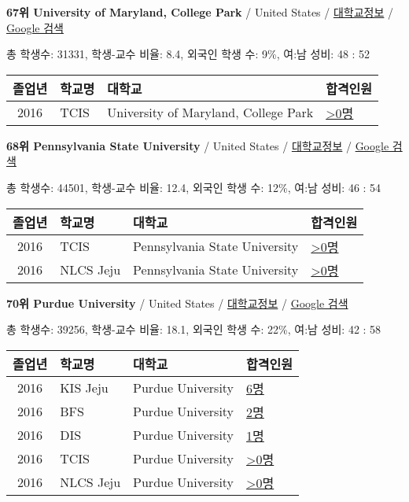 \documentclass[13pt,]{article}
\begin{document}
\textbf{67위 University of Maryland, College Park} / United States /
\href{https://www.timeshighereducation.com/world-university-rankings/university-of-maryland-college-park?ranking-dataset=589595}{대학교정보}
/
\href{http://www.google.com/search?q=University+of+Maryland,+College+Park}{Google
검색}

총 학생수: 31331, 학생-교수 비율: 8.4, 외국인 학생 수: 9\%, 여:남 성비:
48 : 52

\begin{longtable}[]{@{}clll@{}}
\toprule
졸업년 & 학교명 & 대학교 & 합격인원\tabularnewline
\midrule
\endhead
2016 & TCIS & University of Maryland, College Park &
\href{http://cafe.naver.com/assarabia/11598}{\textgreater{}0명}\tabularnewline
\bottomrule
\end{longtable}

\textbf{68위 Pennsylvania State University} / United States /
\href{https://www.timeshighereducation.com/world-university-rankings/pennsylvania-state-university?ranking-dataset=589595}{대학교정보}
/
\href{http://www.google.com/search?q=Pennsylvania+State+University}{Google
검색}

총 학생수: 44501, 학생-교수 비율: 12.4, 외국인 학생 수: 12\%, 여:남
성비: 46 : 54

\begin{longtable}[]{@{}clll@{}}
\toprule
졸업년 & 학교명 & 대학교 & 합격인원\tabularnewline
\midrule
\endhead
2016 & TCIS & Pennsylvania State University &
\href{http://cafe.naver.com/assarabia/11598}{\textgreater{}0명}\tabularnewline
2016 & NLCS Jeju & Pennsylvania State University &
\href{http://cafe.naver.com/assarabia/11592}{\textgreater{}0명}\tabularnewline
\bottomrule
\end{longtable}

\textbf{70위 Purdue University} / United States /
\href{https://www.timeshighereducation.com/world-university-rankings/purdue-university?ranking-dataset=589595}{대학교정보}
/ \href{http://www.google.com/search?q=Purdue+University}{Google 검색}

총 학생수: 39256, 학생-교수 비율: 18.1, 외국인 학생 수: 22\%, 여:남
성비: 42 : 58

\begin{longtable}[]{@{}clll@{}}
\toprule
졸업년 & 학교명 & 대학교 & 합격인원\tabularnewline
\midrule
\endhead
2016 & KIS Jeju & Purdue University &
\href{http://cafe.naver.com/assarabia/11596}{6명}\tabularnewline
2016 & BFS & Purdue University &
\href{http://cafe.naver.com/assarabia/11597}{2명}\tabularnewline
2016 & DIS & Purdue University &
\href{http://cafe.naver.com/assarabia/11591}{1명}\tabularnewline
2016 & TCIS & Purdue University &
\href{http://cafe.naver.com/assarabia/11598}{\textgreater{}0명}\tabularnewline
2016 & NLCS Jeju & Purdue University &
\href{http://cafe.naver.com/assarabia/11592}{\textgreater{}0명}\tabularnewline
\bottomrule
\end{longtable}
\end{document}
